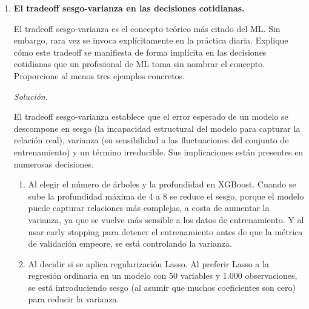 \documentclass[12pt]{article}
\newcommand\sol[1]{\begin{mdframed}
\emph{Solución.} #1
\end{mdframed}}
\begin{document}
\begin{enumerate}
{\medskip
Distinguir un deterioro real de una fluctuación normal exige cierta disciplina estadística. Resulta
útil emplear bandas de control (media $\pm 2\sigma$ o $\pm 3\sigma$ sobre la historia reciente de la
métrica) y activar la alerta solo cuando la métrica cae fuera de la banda de manera persistente, no
puntual. Conviene además exigir que el deterioro se mantenga durante un mínimo de periodos
consecutivos (por ejemplo, tres semanas) antes de reentrenar, para no reaccionar a fluctuaciones
aleatorias, y comparar el periodo deteriorado con periodos históricos de estacionalidad similar, dado
que un descenso que coincide con un patrón estacional conocido no requiere reentrenamiento sino un
ajuste del umbral operativo. Por último, si el cambio en la distribución de las entradas es abrupto y
no gradual, la causa puede ser un error de datos en una fase anterior del pipeline, y no un deterioro
del modelo, por lo que conviene investigar la fuente antes de reentrenar.
}

\item \textbf{El tradeoff sesgo-varianza en las decisiones cotidianas.}

El tradeoff sesgo-varianza es el concepto teórico más citado del ML. Sin embargo, rara vez se
invoca explícitamente en la práctica diaria. Explique cómo este tradeoff se manifiesta de forma
implícita en las decisiones cotidianas que un profesional de ML toma sin nombrar el concepto.
Proporcione al menos tres ejemplos concretos.

\sol{

El tradeoff sesgo-varianza establece que el error esperado de un modelo se descompone en sesgo
(la incapacidad estructural del modelo para capturar la relación real), varianza (su sensibilidad a
las fluctuaciones del conjunto de entrenamiento) y un término irreducible. Sus implicaciones están presentes en numerosas
decisiones.

\begin{enumerate}[1.]
  \item Al elegir el número de árboles y la profundidad en XGBoost. Cuando se sube la profundidad
  máxima de 4 a 8 se reduce el sesgo, porque el modelo puede capturar relaciones más complejas, a
  costa de aumentar la varianza, ya que se vuelve más sensible a los datos de entrenamiento. Y al usar
  early stopping para detener el entrenamiento antes de que la métrica de validación empeore, se está
  controlando la varianza.

  \item Al decidir si se aplica regularización Lasso. Al preferir Lasso a la
  regresión ordinaria en un modelo con 50 variables y 1.000 observaciones, se está introduciendo sesgo
  (al asumir que muchos coeficientes son cero) para reducir la varianza.


\end{enumerate}}
\end{enumerate}
\end{document}
